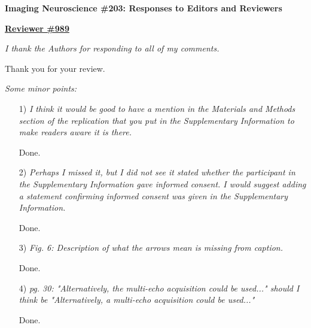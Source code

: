 \documentclass[a4paper,11pt,twoside]{report}
\begin{document}
\begin{center}
	{\large\textbf{Imaging Neuroscience \#203: Responses to Editors and Reviewers}}
\end{center}





\noindent \underline{\textbf{Reviewer \#989}}

\textit{I thank the Authors for responding to all of my comments.}

\hspace{1em} {\color{blue} Thank you for your review.}

\vspace{1em}

\noindent \textit{Some minor points:}

\begin{enumerate}
    \item [1)] \textit{I think it would be good to have a mention in the Materials and Methods section of the replication that you put in the Supplementary Information to make readers aware it is there.}

    \hspace{1em} {\color{blue} Done.}

    \item [2)] \textit{Perhaps I missed it, but I did not see it stated whether the participant in the Supplementary Information gave informed consent. I would suggest adding a statement confirming informed consent was given in the Supplementary Information.}

    \hspace{1em} {\color{blue} Done.}

    \item [3)] \textit{Fig. 6: Description of what the arrows mean is missing from caption.}

    \hspace{1em} {\color{blue} Done.}

    \item [4)] \textit{pg. 30: "Alternatively, the multi-echo acquisition could be used..." should I think be "Alternatively, a multi-echo acquisition could be used..."}

    \hspace{1em} {\color{blue} Done.}

\end{enumerate}
\end{document}
